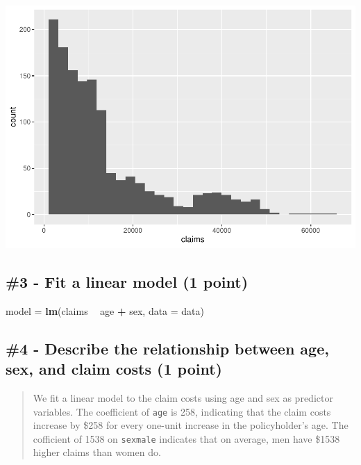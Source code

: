 \documentclass[]{book}
\newenvironment{Shaded}{\begin{snugshade}}{\end{snugshade}}
\newcommand{\DataTypeTok}[1]{\textcolor[rgb]{0.13,0.29,0.53}{#1}}
\newcommand{\KeywordTok}[1]{\textcolor[rgb]{0.13,0.29,0.53}{\textbf{#1}}}
\newcommand{\NormalTok}[1]{#1}
\newcommand{\OperatorTok}[1]{\textcolor[rgb]{0.81,0.36,0.00}{\textbf{#1}}}
\newcommand{\StringTok}[1]{\textcolor[rgb]{0.31,0.60,0.02}{#1}}
\begin{document}
\includegraphics{bookdown-demo_files/figure-latex/unnamed-chunk-19-1.pdf}

\hypertarget{fit-a-linear-model-1-point}{%
\subsection{\#3 - Fit a linear model (1 point)}\label{fit-a-linear-model-1-point}}

\begin{Shaded}
\begin{Highlighting}[]
\NormalTok{model =}\StringTok{ }\KeywordTok{lm}\NormalTok{(claims }\OperatorTok{~}\StringTok{ }\NormalTok{age }\OperatorTok{+}\StringTok{ }\NormalTok{sex, }\DataTypeTok{data =}\NormalTok{ data)}
\end{Highlighting}
\end{Shaded}

\hypertarget{describe-the-relationship-between-age-sex-and-claim-costs-1-point}{%
\subsection{\#4 - Describe the relationship between age, sex, and claim costs (1 point)}\label{describe-the-relationship-between-age-sex-and-claim-costs-1-point}}

\begin{quote}
We fit a linear model to the claim costs using age and sex as predictor variables. The coefficient of \texttt{age} is 258, indicating that the claim costs increase by \$258 for every one-unit increase in the policyholder's age. The cofficient of 1538 on \texttt{sexmale} indicates that on average, men have \$1538 higher claims than women do.
\end{quote}
\end{document}
